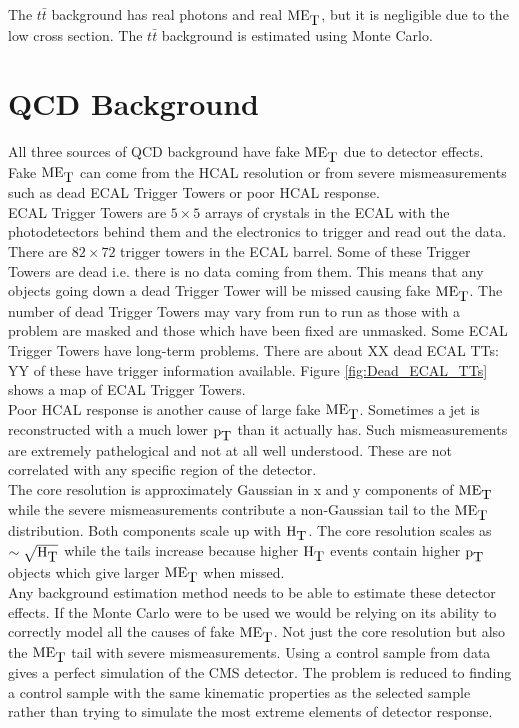The $t\bar{t}$ background has real photons and real $\mbox{ME}_{\mbox{T}}$, but it is negligible 
due to the low cross section. The $t\bar{t}$ background is estimated using Monte
Carlo.

\section{QCD Background}
\label{sec:QCD_Background}

All three sources of QCD background have fake $\mbox{ME}_{\mbox{T}}$ due to detector effects.
Fake $\mbox{ME}_{\mbox{T}}$ can come from the HCAL resolution or from severe mismeasurements
such as dead ECAL Trigger Towers or poor HCAL response. \\

ECAL Trigger Towers are $5\times5$ arrays of crystals in the ECAL with the
photodetectors behind them and the electronics to trigger and read out the data. 
There are $82\times72$ trigger towers in the ECAL barrel. Some of these Trigger
Towers are dead i.e. there is no data coming from them. This means that any
objects going down a dead Trigger Tower will be missed causing fake $\mbox{ME}_{\mbox{T}}$. The 
number of dead Trigger Towers may vary from run to run as those with a problem 
are masked and those which have been fixed are unmasked. Some ECAL Trigger 
Towers have long-term problems. There are about XX dead ECAL TTs: YY of these 
have trigger information available. Figure \ref{fig:Dead_ECAL_TTs} shows a map 
of ECAL Trigger Towers. \\

Poor HCAL response is another cause of large fake $\mbox{ME}_{\mbox{T}}$. Sometimes a jet is
reconstructed with a much lower $\mbox{p}_{\mbox{T}}$ than it actually has. Such mismeasurements
are extremely pathelogical and not at all well understood. These are not
correlated with any specific region of the detector. \\

The core resolution is approximately Gaussian in x and y components of $\mbox{ME}_{\mbox{T}}$ 
while the severe mismeasurements contribute a non-Gaussian tail to the $\mbox{ME}_{\mbox{T}}$ 
distribution. Both components scale up with $\mbox{H}_{\mbox{T}}$. The core resolution scales as
$\sim\sqrt{\mbox{H}_{\mbox{T}}}$ while the tails increase because higher $\mbox{H}_{\mbox{T}}$ events contain 
higher $\mbox{p}_{\mbox{T}}$ objects which give larger $\mbox{ME}_{\mbox{T}}$ when missed. \\

Any background estimation method needs to be able to estimate these detector 
effects. If the Monte Carlo were to be used we would be relying on its ability 
to correctly model all the causes of fake $\mbox{ME}_{\mbox{T}}$. Not just the core resolution 
but also the $\mbox{ME}_{\mbox{T}}$ tail with severe mismeasurements. Using a control sample 
from data gives a perfect simulation of the CMS detector. The problem is reduced
to finding a control sample with the same kinematic properties as the selected 
sample rather than trying to simulate the most extreme elements of detector
response. \\

